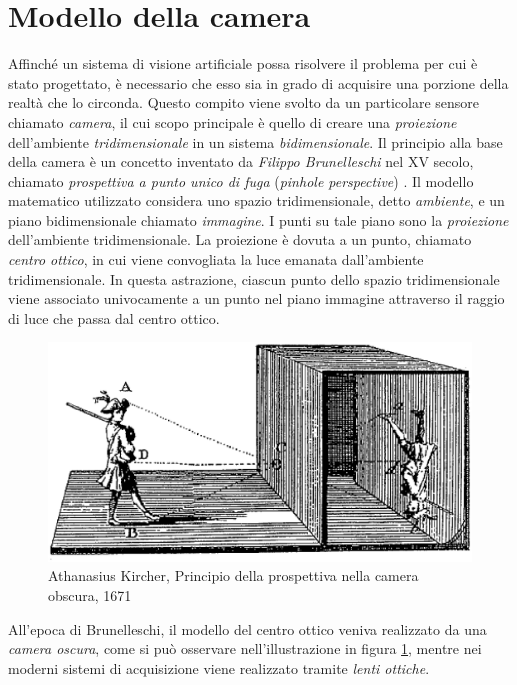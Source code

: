 \section{Modello della camera}
\label{modelloCamera}
Affinch\'e un sistema di visione artificiale possa risolvere il problema per cui \`e stato progettato, \`e necessario che esso sia in grado di acquisire una porzione della realt\`a che lo circonda.
Questo compito viene svolto da un particolare sensore chiamato \textit{camera}, il cui scopo principale \`e quello di creare una \textit{proiezione} dell'ambiente \textit{tridimensionale} in un sistema \textit{bidimensionale}.
Il principio alla base della camera \`e un concetto inventato da \textit{Filippo Brunelleschi} nel XV secolo, chiamato \textit{prospettiva a punto unico di fuga} (\textit{pinhole perspective}) \cite{manetti1976vita}.
Il modello matematico utilizzato considera uno spazio tridimensionale, detto \textit{ambiente}, e un piano bidimensionale chiamato \textit{immagine}. 
I punti su tale piano sono la \textit{proiezione} dell'ambiente tridimensionale.
La proiezione \`e dovuta a un punto, chiamato \textit{centro ottico}, in cui viene convogliata la luce emanata dall'ambiente tridimensionale.
In questa astrazione, ciascun punto dello spazio tridimensionale viene associato univocamente a un punto nel piano immagine attraverso il raggio di luce che passa dal centro ottico.
\begin{figure}
	\centering
	\includegraphics[width=12cm]{./pictures/cameraObscura}
	\caption{Athanasius Kircher, Principio della prospettiva nella camera obscura, 1671}
	\label{fig:prospettiva}
\end{figure} 
All'epoca di Brunelleschi, il modello del centro ottico veniva realizzato da una \textit{camera oscura}, come si pu\`o osservare nell'illustrazione in figura \ref{fig:prospettiva}, mentre nei moderni sistemi di acquisizione viene realizzato tramite \textit{lenti ottiche}. 

